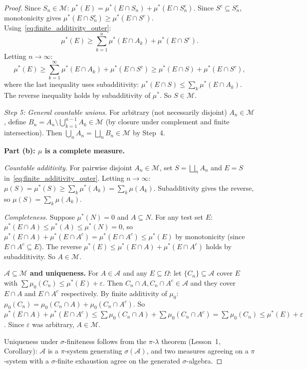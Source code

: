 \documentclass[11pt,a4paper]{article}
\begin{document}
\begin{proof}
Since $S_n \in \mathcal{M}$:
$\mu^*(E) = \mu^*(E \cap S_n) + \mu^*(E \cap S_n^c)$. Since
$S^c \subseteq S_n^c$, monotonicity gives
$\mu^*(E \cap S_n^c) \geq \mu^*(E \cap S^c)$.
Using~\eqref{eq:finite_additivity_outer}:
\begin{equation}
  \mu^*(E) \geq \sum_{k=1}^n \mu^*(E \cap A_k)
    + \mu^*(E \cap S^c).
\end{equation}
Letting $n \to \infty$:
\begin{equation}
  \mu^*(E) \geq \sum_{k=1}^\infty \mu^*(E \cap A_k)
    + \mu^*(E \cap S^c)
    \geq \mu^*(E \cap S) + \mu^*(E \cap S^c),
\end{equation}
where the last inequality uses subadditivity:
$\mu^*(E \cap S) \leq \sum_k \mu^*(E \cap A_k)$. The reverse
inequality holds by subadditivity of $\mu^*$. So
$S \in \mathcal{M}$.

\textit{Step 5: General countable unions.} For arbitrary (not
necessarily disjoint) $A_n \in \mathcal{M}$, define
$B_n = A_n \setminus \bigcup_{k=1}^{n-1} A_k \in \mathcal{M}$ (by
closure under complement and finite intersection). Then
$\bigcup_n A_n = \bigsqcup_n B_n \in \mathcal{M}$ by Step~4.

\textbf{Part (b): $\mu$ is a complete measure.}

\textit{Countable additivity.} For pairwise disjoint
$A_n \in \mathcal{M}$, set $S = \bigsqcup_n A_n$ and $E = S$
in~\eqref{eq:finite_additivity_outer}. Letting $n \to \infty$:
$\mu(S) = \mu^*(S) \geq \sum_k \mu^*(A_k) = \sum_k \mu(A_k)$.
Subadditivity gives the reverse, so
$\mu(S) = \sum_k \mu(A_k)$.

\textit{Completeness.} Suppose $\mu^*(N) = 0$ and
$A \subseteq N$. For any test set $E$:
$\mu^*(E \cap A) \leq \mu^*(A) \leq \mu^*(N) = 0$, so
$\mu^*(E \cap A) + \mu^*(E \cap A^c) = \mu^*(E \cap A^c)
\leq \mu^*(E)$ by monotonicity (since $E \cap A^c \subseteq E$).
The reverse $\mu^*(E) \leq \mu^*(E \cap A) + \mu^*(E \cap A^c)$
holds by subadditivity. So $A \in \mathcal{M}$.

\textbf{$\mathcal{A} \subseteq \mathcal{M}$ and uniqueness.}
For $A \in \mathcal{A}$ and any $E \subseteq \Omega$: let
$\{C_n\} \subseteq \mathcal{A}$ cover $E$ with
$\sum \mu_0(C_n) \leq \mu^*(E) + \varepsilon$. Then
$C_n \cap A, C_n \cap A^c \in \mathcal{A}$ and they cover
$E \cap A$ and $E \cap A^c$ respectively. By finite additivity of
$\mu_0$: $\mu_0(C_n) = \mu_0(C_n \cap A) + \mu_0(C_n \cap A^c)$.
So $\mu^*(E \cap A) + \mu^*(E \cap A^c) \leq
\sum \mu_0(C_n \cap A) + \sum \mu_0(C_n \cap A^c) =
\sum \mu_0(C_n) \leq \mu^*(E) + \varepsilon$. Since $\varepsilon$
was arbitrary, $A \in \mathcal{M}$.

Uniqueness under $\sigma$-finiteness follows from the
$\pi$-$\lambda$ theorem (Lesson~1, Corollary): $\mathcal{A}$ is a
$\pi$-system generating $\sigma(\mathcal{A})$, and two measures
agreeing on a $\pi$-system with a $\sigma$-finite exhaustion agree
on the generated $\sigma$-algebra.
\end{proof}
\end{document}
